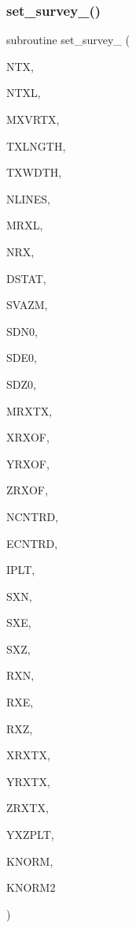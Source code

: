 \subsubsection{\texorpdfstring{set\+\_\+survey\+\_()}{set\_survey\_2()}}
{\footnotesize\ttfamily subroutine set\+\_\+survey\+\_ (\begin{DoxyParamCaption}\item[{integer}]{N\+TX,  }\item[{integer}]{N\+T\+XL,  }\item[{integer}]{M\+X\+V\+R\+TX,  }\item[{real, dimension(ntxl)}]{T\+X\+L\+N\+G\+TH,  }\item[{real, dimension(ntxl)}]{T\+X\+W\+D\+TH,  }\item[{integer}]{N\+L\+I\+N\+ES,  }\item[{integer}]{M\+R\+XL,  }\item[{integer, dimension(nlines)}]{N\+RX,  }\item[{real, dimension(mrxl,ntxl)}]{D\+S\+T\+AT,  }\item[{real, dimension(nlines)}]{S\+V\+A\+ZM,  }\item[{real(kind=ql), dimension(ntxl)}]{S\+D\+N0,  }\item[{real(kind=ql), dimension(ntxl)}]{S\+D\+E0,  }\item[{real, dimension(ntxl)}]{S\+D\+Z0,  }\item[{integer}]{M\+R\+X\+TX,  }\item[{real, dimension(mrxtx,ntxl)}]{X\+R\+X\+OF,  }\item[{real, dimension(mrxtx,ntxl)}]{Y\+R\+X\+OF,  }\item[{real, dimension(mrxtx,ntxl)}]{Z\+R\+X\+OF,  }\item[{real(kind=ql)}]{N\+C\+N\+T\+RD,  }\item[{real(kind=ql)}]{E\+C\+N\+T\+RD,  }\item[{integer, dimension(nlines)}]{I\+P\+LT,  }\item[{real, dimension(mxvrtx,ntx)}]{S\+XN,  }\item[{real, dimension(mxvrtx,ntx)}]{S\+XE,  }\item[{real, dimension(ntx)}]{S\+XZ,  }\item[{real, dimension(mrxl,nlines,1)}]{R\+XN,  }\item[{real, dimension(mrxl,nlines,1)}]{R\+XE,  }\item[{real, dimension(mrxl,nlines)}]{R\+XZ,  }\item[{real, dimension(mrxtx,ntx,1)}]{X\+R\+X\+TX,  }\item[{real, dimension(mrxtx,ntx,1)}]{Y\+R\+X\+TX,  }\item[{real, dimension(mrxtx,ntx)}]{Z\+R\+X\+TX,  }\item[{real(kind=ql), dimension(3,mrxl,nlines)}]{Y\+X\+Z\+P\+LT,  }\item[{integer, dimension(nlines)}]{K\+N\+O\+RM,  }\item[{integer, dimension(mrxtx,ntx)}]{K\+N\+O\+R\+M2 }\end{DoxyParamCaption})}

